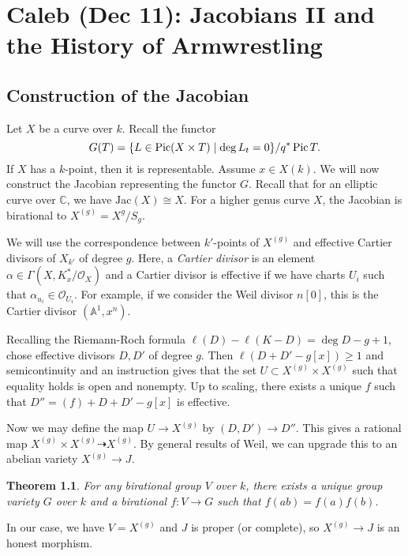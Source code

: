 \documentclass[leqno, openany]{memoir}
\newtheorem{thm}{Theorem}[section]
\theoremstyle{definition}
\theoremstyle{remark}
\theoremstyle{plain}
\theoremstyle{definition}
\theoremstyle{remark}
\newcommand{\A}{\mathbb{A}}
\newcommand{\C}{\mathbb{C}}
\newcommand{\mc}[1]{\mathcal{#1}}
\newcommand{\mr}[1]{\mathrm{#1}}
\DeclareMathOperator{\Pic}{Pic}
\begin{document}
\chapter{Caleb (Dec 11): Jacobians II and the History of Armwrestling}%
\label{cha:caleb_dec_11_jacobians_ii_and_the_history_of_armwrestling}

\section{Construction of the Jacobian}%
\label{sec:construction_of_the_jacobian}

Let $X$ be a curve over $k$. Recall the functor
\[ G(T) = \qty{L \in \Pic(X \times T) \mid \deg L_t = 0} / q^* \Pic T. \]
If $X$ has a $k$-point, then it is representable. Assume $x \in X(k)$. We will now construct the Jacobian representing the functor $G$. Recall that for an elliptic curve over $\C$, we have $\mr{Jac}(X) \cong X$. For a higher genus curve $X$, the Jacobian is birational to $X^{(g)} = X^g / S_g$.

We will use the correspondence between $k'$-points of $X^{(g)}$ and effective Cartier divisors of $X_{k'}$ of degree $g$. Here, a \textit{Cartier divisor} is an element $\alpha \in \Gamma(X, K_x^* / \mc{O}_X)$ and a Cartier divisor is effective if we have charts $U_i$ such that $\alpha_{u_i} \in \mc{O}_{U_i}$. For example, if we consider the Weil divisor $n[0]$, this is the Cartier divisor $(\A^1, x^n)$.

Recalling the Riemann-Roch formula $\ell(D) - \ell(K - D) = \deg D - g + 1$, chose effective divisors $D, D'$ of degree $g$. Then $\ell(D+D' - g[x]) \geq 1$ and semicontinuity and an instruction gives that the set $U \subset X^{(g)} \times X^{(g)}$ such that equality holds is open and nonempty. Up to scaling, there exists a unique $f$ such that $D'' = (f) + D + D' - g[x]$ is effective.

Now we may define the map $U \to X^{(g)}$ by $(D, D') \to D''$. This gives a rational map $X^{(g)} \times X^{(g)} \dashrightarrow X^{(g)}$. By general results of Weil, we can upgrade this to an abelian variety $X^{(g)} \to J$.

\begin{thm}
    For any birational group $V$ over $k$, there exists a unique group variety $G$ over $k$ and a birational $f \colon V \to G$ such that $f(ab) = f(a) f(b)$.
\end{thm}

In our case, we have $V = X^{(g)}$ and $J$ is proper (or complete), so $X^{(g)} \to J$ is an honest morphism. 
\end{document}
